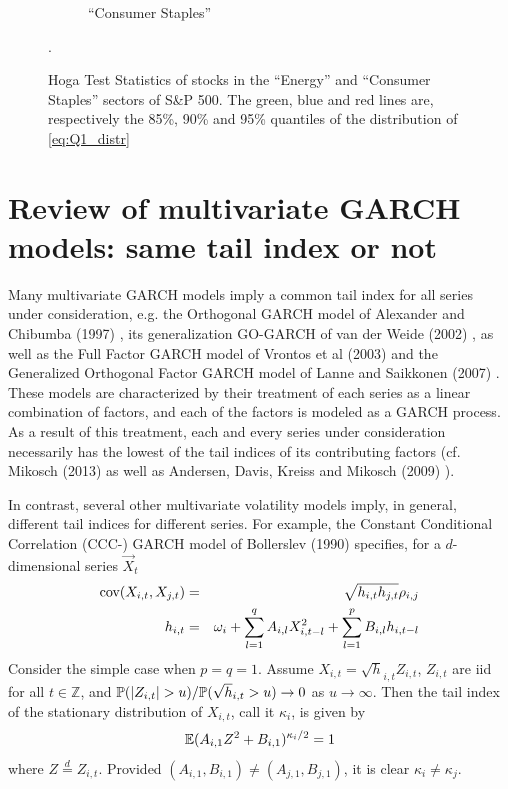 \documentclass{article}
\begin{document}
\begin{figure}[htb!]
\begin{subfigure}[b]{0.5\linewidth}
    \caption{``Consumer Staples''}
    \label{fig:Hoga_consumer_Staples_Single}
  \end{subfigure}
  \caption{Hoga Test Statistics of stocks in the ``Energy'' and
    ``Consumer Staples'' sectors of
    S\&P 500. The green, blue and red lines are, respectively the
    85\%, 90\% and 95\% quantiles of the distribution of
    \eqref{eq:Q1_distr}}.
\end{figure}



\section{Review of multivariate GARCH models:
  same tail index or not}
Many multivariate GARCH models imply a common tail index for all
series under consideration, e.g. the Orthogonal GARCH model of
Alexander and Chibumba (1997) \cite{alexander1997multivariate}, its
generalization GO-GARCH of van der Weide (2002) \cite{van2002go}, as
well as the Full Factor GARCH model of Vrontos et al (2003)
\cite{vrontos2003full} and the Generalized Orthogonal Factor GARCH
model of Lanne and Saikkonen (2007) \cite{lanne2007modeling}. These
models are characterized by their treatment of each series as a linear
combination of factors, and each of the factors is modeled as a GARCH
process. As a result of this treatment, each and every series under
consideration necessarily has the lowest of the tail indices of its
contributing factors (cf. Mikosch (2013) \cite{Mikosch2013} as well
as Andersen, Davis, Kreiss and Mikosch (2009)
\cite{andersen2009handbook}).

In contrast, several other multivariate volatility models imply, in
general, different tail indices for different series. For example, the
Constant Conditional Correlation (CCC-) GARCH model of Bollerslev
(1990) \cite{bollerslev1990modelling} specifies, for a $d$-dimensional
series $\vec X_t$
\begin{eqnarray}
  \cov(X_{i,t}, X_{j,t}) &=& \sqrt{h_{i,t} h_{j,t}} \rho_{i,j}
  \nonumber \\
  h_{i,t} &=& \omega_i + \sum_{l=1}^q A_{i,l} X_{i, t-l}^2 +
  \sum_{l=1}^p B_{i,l} h_{i, t-l} \label{eq:CCC-GARCH}
\end{eqnarray}
Consider the simple case when $p=q=1$. Assume
$X_{i, t} = \sqrt h_{i,t} Z_{i,t}$, $Z_{i, t}$ are iid for
all $t \in \mathbb Z$, and $\P(|Z_{i,t}| > u)/\P(\sqrt h_{i,t} > u) \to 0$ as
$u \to \infty$. Then the tail index of the stationary distribution of
$X_{i,t}$, call it $\kappa_i$, is given by
\[
\E (A_{i, 1} Z^2 + B_{i, 1})^{\kappa_i / 2} = 1
\]
where $Z \overset{d}{=} Z_{i,t}$.
Provided $(A_{i,1}, B_{i,1}) \neq (A_{j,1}, B_{j,1})$, it is clear
$\kappa_i \neq \kappa_j$.
\end{document}
